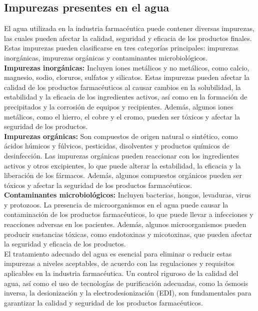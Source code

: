\subsection{Impurezas presentes en el agua}

El agua utilizada en la industria farmacéutica puede contener diversas impurezas, las cuales pueden afectar la calidad, seguridad y eficacia de los productos finales. Estas impurezas pueden clasificarse en tres categorías principales: impurezas inorgánicas, impurezas orgánicas y contaminantes microbiológicos.\\

\textbf{Impurezas inorgánicas: }Incluyen iones metálicos y no metálicos, como calcio, magnesio, sodio, cloruros, sulfatos y silicatos. Estas impurezas pueden afectar la calidad de los productos farmacéuticos al causar cambios en la solubilidad, la estabilidad y la eficacia de los ingredientes activos, así como en la formación de precipitados y la corrosión de equipos y recipientes. Además, algunos iones metálicos, como el hierro, el cobre y el cromo, pueden ser tóxicos y afectar la seguridad de los productos.\\

\textbf{Impurezas orgánicas: }Son compuestos de origen natural o sintético, como ácidos húmicos y fúlvicos, pesticidas, disolventes y productos químicos de desinfección. Las impurezas orgánicas pueden reaccionar con los ingredientes activos y otros excipientes, lo que puede alterar la estabilidad, la eficacia y la liberación de los fármacos. Además, algunos compuestos orgánicos pueden ser tóxicos y afectar la seguridad de los productos farmacéuticos.\\

\textbf{Contaminantes microbiológicos:} Incluyen bacterias, hongos, levaduras, virus y protozoos. La presencia de microorganismos en el agua puede causar la contaminación de los productos farmacéuticos, lo que puede llevar a infecciones y reacciones adversas en los pacientes. Además, algunos microorganismos pueden producir sustancias tóxicas, como endotoxinas y micotoxinas, que pueden afectar la seguridad y eficacia de los productos.\\

El tratamiento adecuado del agua es esencial para eliminar o reducir estas impurezas a niveles aceptables, de acuerdo con las regulaciones y requisitos aplicables en la industria farmacéutica. Un control riguroso de la calidad del agua, así como el uso de tecnologías de purificación adecuadas, como la ósmosis inversa, la desionización y la electrodesionización (EDI), son fundamentales para garantizar la calidad y seguridad de los productos farmacéuticos.\\
